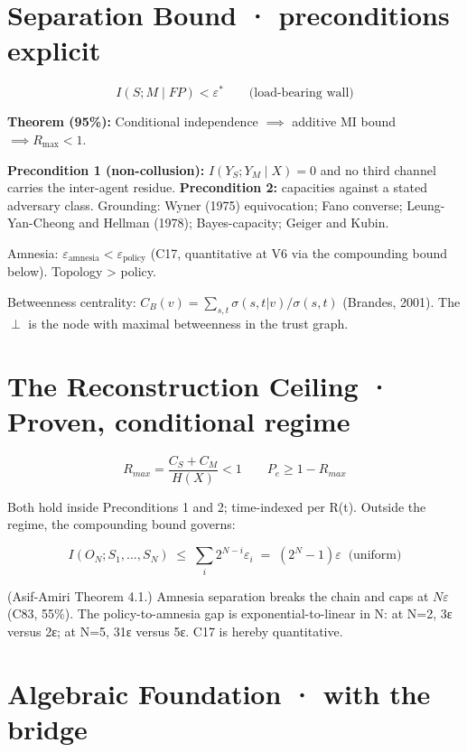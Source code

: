 \documentclass[
]{article}
\begin{document}
\section{Separation Bound · preconditions
explicit}\label{separation-bound-preconditions-explicit}

\[I(S; M \mid FP) < \varepsilon^* \qquad \text{(load-bearing wall)}\]

\textbf{Theorem (95\%):} Conditional independence \(\implies\) additive
MI bound \(\implies R_{\max} < 1\).

\textbf{Precondition 1 (non-collusion):} \(I(Y_S; Y_M \mid X) = 0\) and
no third channel carries the inter-agent residue. \textbf{Precondition
2:} capacities against a stated adversary class. Grounding: Wyner (1975)
equivocation; Fano converse; Leung-Yan-Cheong and Hellman (1978);
Bayes-capacity; Geiger and Kubin.

Amnesia: \(\varepsilon_{\text{amnesia}} < \varepsilon_{\text{policy}}\)
(C17, quantitative at V6 via the compounding bound below). Topology
\textgreater{} policy.

Betweenness centrality:
\(C_B(v) = \sum_{s,t} \sigma(s,t|v)/\sigma(s,t)\) (Brandes, 2001). The
\(\perp\) is the node with maximal betweenness in the trust graph.

\section{The Reconstruction Ceiling · Proven, conditional
regime}\label{the-reconstruction-ceiling-proven-conditional-regime}

\[R_{max} = \frac{C_S + C_M}{H(X)} < 1 \qquad P_e \geq 1 - R_{max}\]

Both hold inside Preconditions 1 and 2; time-indexed per R(t). Outside
the regime, the compounding bound governs:

\[I(O_N; S_1, \dots, S_N) \;\leq\; \sum_{i} 2^{N-i}\varepsilon_i \;=\; (2^N - 1)\varepsilon \;\;\text{(uniform)}\]

(Asif-Amiri Theorem 4.1.) Amnesia separation breaks the chain and caps
at \(N\varepsilon\) (C83, 55\%). The policy-to-amnesia gap is
exponential-to-linear in N: at N=2, 3ε versus 2ε; at N=5, 31ε versus 5ε.
C17 is hereby quantitative.

\section{Algebraic Foundation · with the
bridge}\label{algebraic-foundation-with-the-bridge}
\end{document}
